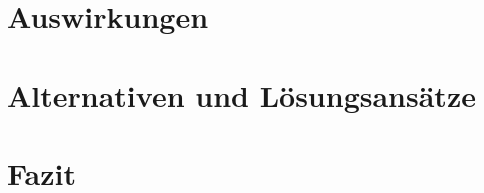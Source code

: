 \documentclass[ngerman]{seminarvorlage}
\begin{document}
\section{Auswirkungen}

\section{Alternativen und Lösungsansätze}

\section{Fazit}


%
%


\end{document}
